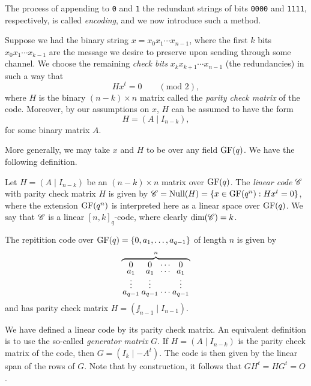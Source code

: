 \documentclass[../../../main]{subfiles}
\begin{document}
The process of appending to {\tt 0} and {\tt 1} the redundant strings of bits {\tt 0000} and {\tt 1111}, respectively, is called {\it encoding}, and we now introduce such a method.

Suppose we had the binary string $x=x_0 x_1 \cdots x_{n-1}$, where the first $k$ bits $x_0 x_1 \cdots x_{k-1}$ are the message we desire to preserve upon sending through some channel. We choose the remaining {\it check bits} $x_k x_{k+1} \cdots x_{n-1}$ (the redundancies) in such a way that
\[
Hx^t = 0 \qquad (\text{mod } 2),
\]
where $H$ is the binary $(n-k) \times n$ matrix called the {\it parity check matrix} of the code. Moreover, by our assumptions on $x$, $H$ can be assumed to have the form
\[
H=(A \mid I_{n-k}),
\]
for some binary matrix $A$. 

More generally, we may take $x$ and $H$ to be over any field $\text{GF}(q)$. We have the following definition.

\begin{defin}\label{linear-code-defin}
 Let $H=(A \mid I_{n-k})$ be an $(n-k) \times n$ matrix over $\text{GF}(q)$. The {\it linear code} $\mathscr{C}$ with parity check matrix $H$ is given by $\mathscr{C} = \text{Null}(H) = \{x \in \text{GF}(q^n) : Hx^t = 0\}$, where the extension $\text{GF}(q^n)$ is interpreted here as a linear space over $\text{GF}(q)$. We say that $\mathscr{C}$ is a linear $[n,k]_q$-code, where clearly $\text{dim}(\mathscr{C}) = k$.
\end{defin}

\begin{ex}
 The repitition code over $\text{GF}(q) = \{0,a_1,\dots,a_{q-1}\}$ of length $n$ is given by
 \begin{equation}
 \arraycolsep=1.25pt\def\arraystretch{0.625}
  \overbrace{
  \begin{array}{cccc}
  \arraycolsep=1.0pt\def\arraystretch{1.0}
   0 & 0 & \cdots & 0 \\
   a_1 & a_1 & \cdots & a_1 \\
   \vdots & \vdots & & \vdots \\
   a_{q-1} & a_{q-1} & \cdots & a_{q-1}
  \end{array}
  }^n
 \end{equation}
 and has parity check matrix $H = (\jj_{n-1} \mid I_{n-1})$.
\end{ex}

We have defined a linear code by its parity check matrix. An equivalent definition is to use the so-called {\it generator matrix} $G$. If $H=(A \mid I_{n-k})$ is the parity check matrix of the code, then $G=(I_k \mid -A^t)$. The code is then given by the linear span of the rows of $G$. Note that by construction, it follows that $GH^t = HG^t = O$.
\end{document}
